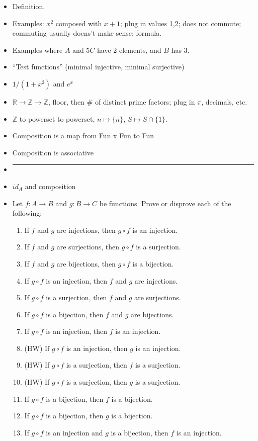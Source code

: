 \documentclass[12pt]{article}
\begin{document}
\begin{itemize}
\item Definition. 
\item Examples: $x^2$ composed with $x+1$; plug in values 1,2; does not commute; commuting usually doens't make sense; formula. 
\item Examples where $A$ and 5$C$ have 2 elements, and $B$ has 3. 
\item ``Test functions'' (minimal injective, minimal surjective)
\item $1/(1+x^2)$ and $e^x$
\item $\mathbb{R} \to \mathbb{Z} \to \mathbb{Z}$, floor, then \# of distinct prime factors; plug in $\pi$, decimals, etc. 
\item $\mathbb{Z}$ to powerset to powerset, $n \mapsto \{n\}$, $S \mapsto S \cap \{1\}$.
\item Composition is a map from Fun x Fun to Fun
\item Composition is associative
\item []       \vspace{0.1cm}\hrule\vspace{-0.4cm}       
\item $id_A$ and composition

\item   Let $f\colon A \to B$ and $g \colon B \to C$ be functions. Prove or
  disprove each of the following:
  \begin{enumerate}
  \item If $f$ and $g$ are injections, then $g \circ f$ is an injection.
  \item If $f$ and $g$ are surjections, then $g \circ f$ is a surjection.
  \item If $f$ and $g$ are bijections, then $g \circ f$ is a bijection.
  \item If $g \circ f$ is an injection, then $f$ and $g$ are injections.
  \item If $g \circ f$ is a surjection, then $f$ and $g$ are surjections.
  \item If $g \circ f$ is a bijection, then $f$ and $g$ are bijections.
  \item If $g \circ f$ is an injection, then $f$ is an injection.
  \item (HW) If $g \circ f$ is an injection, then $g$ is an injection.
  \item (HW) If $g \circ f$ is a surjection, then $f$ is a surjection.
  \item (HW) If $g \circ f$ is a surjection, then $g$ is a surjection.
  \item If $g \circ f$ is a bijection, then $f$ is a bijection.
  \item If $g \circ f$ is a bijection, then $g$ is a bijection.
  \item If $g \circ f$ is an injection and $g$ is a bijection, then $f$ is an
    injection.
  \end{enumerate}




\end{itemize}
\end{document}
